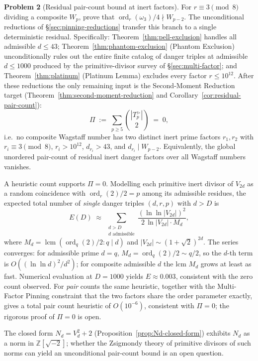 \documentclass[12pt]{article}
\theoremstyle{plain}
\theoremstyle{definition}
\theoremstyle{remark}
\begin{document}
\textbf{Problem 2} (Residual pair-count bound at inert factors). For
\(r \equiv 3 \pmod{8}\) dividing a composite \(W_p\), prove that
\(\operatorname{ord}_r(\omega_3)/4 \nmid W_{p-2}\). The unconditional
reductions of \S\ref{sec:pinning-reductions} transfer this branch
to a single deterministic residual. Specifically:
Theorem~\ref{thm:pell-exclusion} handles all admissible
\(d \leq 43\); Theorem~\ref{thm:phantom-exclusion} (Phantom
Exclusion) unconditionally rules out the entire finite catalog of
danger triples at admissible \(d \leq 1000\) produced by the
primitive-divisor survey of \S\ref{sec:multi-factor}; and
Theorem~\ref{thm:platinum} (Platinum Lemma) excludes every factor
\(r \leq 10^{12}\). After these reductions the only remaining
input is the Second-Moment Reduction target
(Theorem~\ref{thm:second-moment-reduction} and
Corollary~\ref{cor:residual-pair-count}):
\[
  \Pi \;:=\; \sum_{p \geq 5} \binom{|T_p^{>}|}{2} \;=\; 0,
\]
i.e.\ no composite Wagstaff number has two distinct inert prime
factors \(r_1, r_2\) with \(r_i \equiv 3 \pmod 8\),
\(r_i > 10^{12}\), \(d_{r_i} > 43\), and
\(d_{r_i} \mid W_{p-2}\). Equivalently, the global unordered
pair-count of residual inert danger factors over all Wagstaff
numbers vanishes.

A heuristic count supports \(\Pi = 0\). Modelling each primitive
inert divisor of \(V_{2d}\) as a random coincidence with
\(\operatorname{ord}_r(2)/2 = p\) among its admissible residues,
the expected total number of \emph{single} danger triples
\((d, r, p)\) with \(d > D\) is
\[
  E(D) \;\approx\; \sum_{\substack{d > D \\ d \text{ admissible}}}
  \frac{(\ln\ln|V_{2d}|)^2}{2\,\ln|V_{2d}| \cdot M_d},
\]
where \(M_d = \operatorname{lcm}(\operatorname{ord}_q(2)/2 : q \mid d)\)
and \(|V_{2d}| \sim (1+\sqrt{2})^{2d}\). The series converges:
for admissible prime \(d = q\), \(M_d = \operatorname{ord}_q(2)/2
\sim q/2\), so the \(d\)-th term is
\(O((\ln\ln d)^2/d^2)\); for composite admissible \(d\) the lcm
\(M_d\) grows at least as fast. Numerical evaluation at
\(D = 1000\) yields \(E \approx 0.003\), consistent with the zero
count observed. For \emph{pair} counts the same heuristic, together
with the Multi-Factor Pinning constraint that the two factors
share the order parameter exactly, gives a total pair count
heuristic of \(O(10^{-6})\), consistent with \(\Pi = 0\); the
rigorous proof of \(\Pi = 0\) is open.

The closed form \(N_d = V_d^2 + 2\)
(Proposition~\ref{prop:Nd-closed-form}) exhibits \(N_d\) as a norm
in \(\mathbb{Z}[\sqrt{-2}]\); whether the Zsigmondy theory of
primitive divisors of such norms can yield an unconditional
pair-count bound is an open question.
\end{document}
